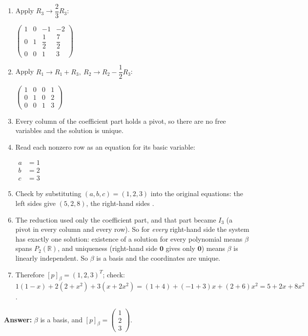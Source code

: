 \documentclass[11pt]{article}
\begin{document}
\begin{tcolorbox}[breakable,colback=ans,colframe=ansb,boxrule=0.5pt,left=4pt,right=4pt,top=2pt,bottom=2pt]
\begin{enumerate}[leftmargin=3.1em,itemsep=1pt,topsep=1pt,label=\textbf{Step \arabic*.}]
\item Apply $R_3\to \dfrac{2}{3} R_3$:\par\smallskip $\displaystyle \left(\begin{array}{ccc|c}1 & 0 & -1 & -2 \\ 0 & 1 & \dfrac{1}{2} & \dfrac{7}{2} \\ 0 & 0 & 1 & 3\end{array}\right)$
\item Apply $R_1\to R_1+R_3,\ R_2\to R_2-\dfrac{1}{2}R_3$:\par\smallskip $\displaystyle \left(\begin{array}{ccc|c}1 & 0 & 0 & 1 \\ 0 & 1 & 0 & 2 \\ 0 & 0 & 1 & 3\end{array}\right)$
\item Every column of the coefficient part holds a pivot, so there are no free variables and the solution is unique.
\item Read each nonzero row as an equation for its basic variable:\par\smallskip $\displaystyle\begin{aligned}a&=1\\ b&=2\\ c&=3\end{aligned}$
\item Check by substituting $(a,b,c)=(1,2,3)$ into the original equations: the left sides give $(5,2,8)$, the right-hand sides \checkmark.
\item The reduction used only the coefficient part, and that part became $I_3$ (a pivot in every column and every row). So for \emph{every} right-hand side the system has exactly one solution: existence of a solution for every polynomial means $\beta$ spans $P_2(\mathbb{R})$, and uniqueness (right-hand side $\mathbf 0$ gives only $\mathbf 0$) means $\beta$ is linearly independent. So $\beta$ is a basis and the coordinates are unique.
\item Therefore $[p]_\beta=(1,2,3)^{T}$; check: $1(1-x)+2(2+x^{2})+3(x+2x^{2})=(1+4)+(-1+3)x+(2+6)x^{2}=5+2x+8x^{2}$ \checkmark.
\end{enumerate}\textbf{Answer:} $\beta$ is a basis, and $[p]_\beta=\begin{pmatrix}1\\2\\3\end{pmatrix}$.\end{tcolorbox}
\par\vspace{2pt}
\end{document}
